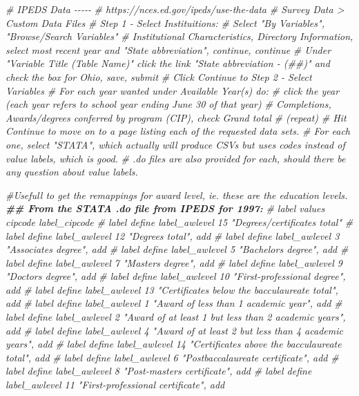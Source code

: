 \documentclass[
]{article}
\newenvironment{Shaded}{\begin{snugshade}}{\end{snugshade}}
\newcommand{\CommentTok}[1]{\textcolor[rgb]{0.56,0.35,0.01}{\textit{#1}}}
\newcommand{\DocumentationTok}[1]{\textcolor[rgb]{0.56,0.35,0.01}{\textbf{\textit{#1}}}}
\begin{document}
\begin{Shaded}
\begin{Highlighting}[]
\CommentTok{\# IPEDS Data {-}{-}{-}{-}{-}}
\CommentTok{\# https://nces.ed.gov/ipeds/use{-}the{-}data}
\CommentTok{\# Survey Data \textgreater{} Custom Data Files}
\CommentTok{\# Step 1 {-} Select Instituitions:}
\CommentTok{\# Select "By Variables", "Browse/Search Variables"}
\CommentTok{\#  Institutional Characteristics, Directory Information, select most recent year and "State abbreviation", continue, continue}
\CommentTok{\#   Under "Variable Title (Table Name)" click the link "State abbreviation {-} (\#\#)" and check the box for Ohio, save, submit}
\CommentTok{\# Click Continue to Step 2 {-} Select Variables}
\CommentTok{\# For each year wanted under Available Year(s) do:}
\CommentTok{\#   click the year (each year refers to school year ending June 30 of that year)}
\CommentTok{\#   Completions, Awards/degrees conferred by program (CIP), check Grand total}
\CommentTok{\#   (repeat)}
\CommentTok{\# Hit Continue to move on to a page listing each of the requested data sets.}
\CommentTok{\# For each one, select "STATA", which actually will produce CSVs but uses codes instead of value labels, which is good.}
\CommentTok{\# .do files are also provided for each, should there be any question about value labels.}



\CommentTok{\#Usefull to get the remappings for award level, ie. these are the education levels. }
\DocumentationTok{\#\# From the STATA .do file from IPEDS for 1997:}
\CommentTok{\# label values cipcode         label\_cipcode        }
\CommentTok{\# label define label\_awlevel         15 "Degrees/certificates total"}
\CommentTok{\# label define label\_awlevel         12 "Degrees total", add}
\CommentTok{\# label define label\_awlevel         3 "Associate\textquotesingle{}\textquotesingle{}s degree", add}
\CommentTok{\# label define label\_awlevel         5 "Bachelor\textquotesingle{}\textquotesingle{}s degree", add}
\CommentTok{\# label define label\_awlevel         7 "Master\textquotesingle{}\textquotesingle{}s degree", add}
\CommentTok{\# label define label\_awlevel         9 "Doctor\textquotesingle{}\textquotesingle{}s degree", add}
\CommentTok{\# label define label\_awlevel         10 "First{-}professional degree", add}
\CommentTok{\# label define label\_awlevel         13 "Certificates below the bacculaureate total", add}
\CommentTok{\# label define label\_awlevel         1 "Award of less than 1 academic year", add}
\CommentTok{\# label define label\_awlevel         2 "Award of at least 1 but less than 2 academic years", add}
\CommentTok{\# label define label\_awlevel         4 "Award of at least 2 but less than 4 academic years", add}
\CommentTok{\# label define label\_awlevel         14 "Certificates above the bacculaureate total", add}
\CommentTok{\# label define label\_awlevel         6 "Postbaccalaureate certificate", add}
\CommentTok{\# label define label\_awlevel         8 "Post{-}master\textquotesingle{}\textquotesingle{}s certificate", add}
\CommentTok{\# label define label\_awlevel         11 "First{-}professional certificate", add}


\end{Highlighting}
\end{Shaded}
\end{document}
